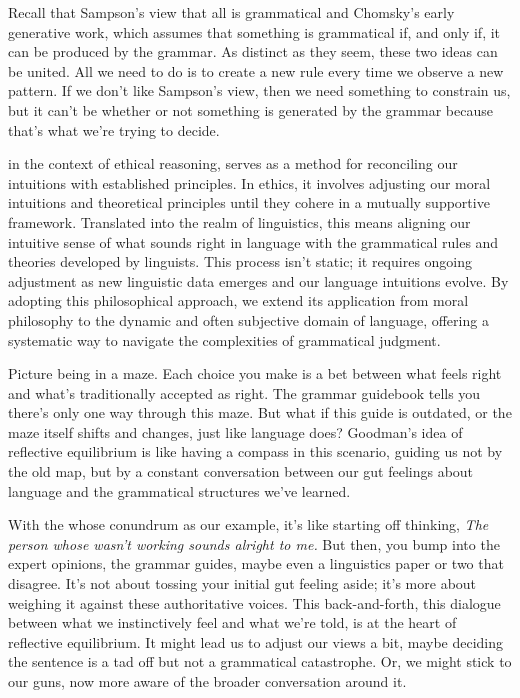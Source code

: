 \bigskip

Recall that Sampson's view that all is grammatical and Chomsky's early generative work, which assumes that something is grammatical if, and only if, it can be produced by the grammar. As distinct as they seem, these two ideas can be united. All we need to do is to create a new rule every time we observe a new pattern. If we don't like Sampson's view, then we need something to constrain us, but it can't be whether or not something is generated by the grammar because that's what we're trying to decide.

in the context of ethical reasoning, serves as a method for reconciling our intuitions with established principles. In ethics, it involves adjusting our moral intuitions and theoretical principles until they cohere in a mutually supportive framework. Translated into the realm of linguistics, this means aligning our intuitive sense of what sounds right in language with the grammatical rules and theories developed by linguists. This process isn't static; it requires ongoing adjustment as new linguistic data emerges and our language intuitions evolve. By adopting this philosophical approach, we extend its application from moral philosophy to the dynamic and often subjective domain of language, offering a systematic way to navigate the complexities of grammatical judgment.

Picture being in a maze. Each choice you make is a bet between what feels right and what's traditionally accepted as right. The grammar guidebook tells you there's only one way through this maze. But what if this guide is outdated, or the maze itself shifts and changes, just like language does? Goodman's idea of reflective equilibrium is like having a compass in this scenario, guiding us not by the old map, but by a constant conversation between our gut feelings about language and the grammatical structures we've learned.

With the whose conundrum as our example, it's like starting off thinking, \textit{The person whose wasn't working sounds alright to me.} But then, you bump into the expert opinions, the grammar guides, maybe even a linguistics paper or two that disagree. It's not about tossing your initial gut feeling aside; it's more about weighing it against these authoritative voices. This back-and-forth, this dialogue between what we instinctively feel and what we're told, is at the heart of reflective equilibrium. It might lead us to adjust our views a bit, maybe deciding the sentence is a tad off but not a grammatical catastrophe. Or, we might stick to our guns, now more aware of the broader conversation around it.

